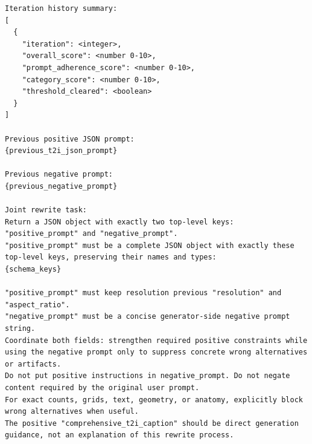 \begin{tcolorbox}
\begin{Verbatim}[breaklines=true,breakanywhere=true,fontsize=\scriptsize]
Iteration history summary:
[
  {
    "iteration": <integer>,
    "overall_score": <number 0-10>,
    "prompt_adherence_score": <number 0-10>,
    "category_score": <number 0-10>,
    "threshold_cleared": <boolean>
  }
]

Previous positive JSON prompt:
{previous_t2i_json_prompt}

Previous negative prompt:
{previous_negative_prompt}

Joint rewrite task:
Return a JSON object with exactly two top-level keys: "positive_prompt" and "negative_prompt".
"positive_prompt" must be a complete JSON object with exactly these top-level keys, preserving their names and types:
{schema_keys}

"positive_prompt" must keep resolution previous "resolution" and "aspect_ratio".
"negative_prompt" must be a concise generator-side negative prompt string.
Coordinate both fields: strengthen required positive constraints while using the negative prompt only to suppress concrete wrong alternatives or artifacts.
Do not put positive instructions in negative_prompt. Do not negate content required by the original user prompt.
For exact counts, grids, text, geometry, or anatomy, explicitly block wrong alternatives when useful.
The positive "comprehensive_t2i_caption" should be direct generation guidance, not an explanation of this rewrite process.
\end{Verbatim}
\end{tcolorbox}
